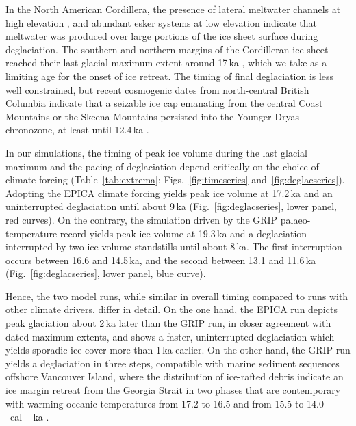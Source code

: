 \documentclass[tc]{copernicus}
\begin{document}
In the North American Cordillera, the presence of lateral meltwater channels
at high elevation \citep{Margold.etal.2011, Margold.etal.2013a,
Margold.etal.2014}, and abundant esker systems at low elevation
\citep{Burke.etal.2012, Burke.etal.2012a, Perkins.etal.2013, Margold.etal.2013}
indicate that meltwater was produced over large portions of the ice sheet
surface during deglaciation. The southern and northern margins of the
Cordilleran ice sheet reached their last glacial maximum extent around
17\,ka \citep[Sect.~\ref{sec:timing};][]{Porter.Swanson.1998, Cosma.etal.2008,
Stroeven.etal.2010, Stroeven.etal.2014}, which we take as a limiting age for
the onset of ice retreat. The timing of final deglaciation is less well
constrained, but recent cosmogenic dates from north-central British Columbia
indicate that a seizable ice cap emanating from the central Coast Mountains or
the Skeena Mountains persisted into the Younger Dryas chronozone, at least
until 12.4\,ka \citep{Margold.etal.2014}.

In our simulations, the timing of peak ice volume during the last glacial
maximum and the pacing of deglaciation depend critically on the choice of
climate forcing (Table~\ref{tab:extrema}; Figs.~\ref{fig:timeseries}
and~\ref{fig:deglacseries}). Adopting the EPICA climate forcing yields peak ice
volume at 17.2\,ka and an uninterrupted deglaciation until about 9\,ka
(Fig.~\ref{fig:deglacseries}, lower panel, red curves). On the contrary, the
simulation driven by the GRIP palaeo-temperature record yields peak ice volume
at 19.3\,ka and a deglaciation interrupted by two ice volume standstills until
about 8\,ka. The first interruption occurs between 16.6 and 14.5\,ka, and the
second between 13.1 and 11.6\,ka (Fig.~\ref{fig:deglacseries}, lower panel,
blue curve).

Hence, the two model runs, while similar in overall timing compared to runs
with other climate drivers, differ in detail. On the one hand, the EPICA run
depicts peak glaciation about 2\,ka later than the GRIP run, in closer
agreement with dated maximum extents, and shows a faster, uninterrupted
deglaciation which yields sporadic ice cover more than 1\,ka earlier. On the
other hand, the GRIP run yields a deglaciation in three steps, compatible with
marine sediment sequences offshore Vancouver Island, where the distribution of
ice-rafted debris indicate an ice margin retreat from the Georgia Strait in two
phases that are contemporary with warming oceanic temperatures from 17.2 to
16.5 and from 15.5 to 14.0\,\unit{\,cal\,ka}
\citep{Taylor.etal.2014}.
\end{document}
